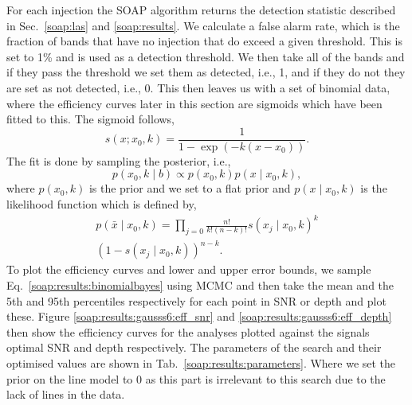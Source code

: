 %
%
For each injection the SOAP algorithm returns the detection statistic described in Sec.~\ref{soap:las} and \ref{soap:results}.
We calculate a false alarm rate, which is the fraction of bands that have no injection that do exceed a given threshold. This is set to 1\% and is used as a detection threshold.
We then take all of the bands and if they pass the threshold we set them as detected, i.e., 1, and if they do not they are set as not detected, i.e., 0.
This then leaves us with a set of binomial data, where the efficiency curves later in this section are sigmoids which have been fitted to this.
The sigmoid follows,
\begin{equation}
s(x; x_0, k)  = \frac{1}{1-\exp{(-k(x - x_0))}}.
\end{equation}
The fit is done by sampling the posterior, i.e.,
\begin{equation}
\label{soap:results:binomialbayes}
p(x_0, k \mid b) \propto  p(x_0,k)p(x \mid x_0, k),
\end{equation}
where $p(x_0,k)$ is the prior and we set to a flat prior and $p(x \mid x_0, k)$ is the likelihood function which is defined by,
\begin{equation}
\begin{split}
p(\bar{x} \mid x_0, k) = \prod_{j=0}\frac{n!}{k!(n-k)!}s(x_j \mid x_0, k)^{k} \\ (1-s(x_j \mid x_0,k))^{n-k}.
\end{split}
\end{equation}
To plot the efficiency curves and lower and upper error bounds, we sample Eq.~\ref{soap:results:binomialbayes} using \gls{MCMC} and then take the mean and the 5th and 95th percentiles respectively for each point in SNR or depth and plot these.
Figure \ref{soap:results:gausss6:eff_snr} and \ref{soap:results:gausss6:eff_depth} then show the efficiency curves for the analyses plotted against the signals optimal \gls{SNR} and depth respectively.
The parameters of the search and their optimised values are shown in Tab.~\ref{soap:results:parameters}. Where we set the prior on the line model to 0 as this part is irrelevant to this search due to the lack of lines in the data.


